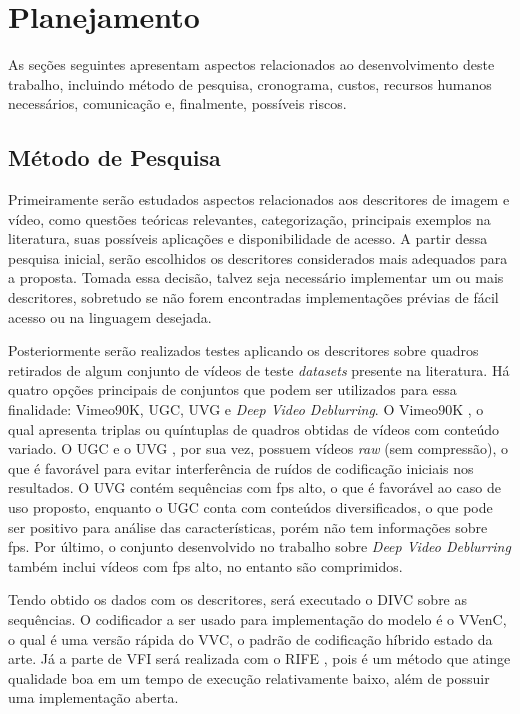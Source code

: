 \chapter{Planejamento}

As seções seguintes apresentam aspectos relacionados ao desenvolvimento deste trabalho, incluindo método de pesquisa, cronograma, custos, recursos humanos necessários, comunicação e, finalmente, possíveis riscos.

\section{Método de Pesquisa}

Primeiramente serão estudados aspectos relacionados aos descritores de imagem e vídeo, como questões teóricas relevantes, categorização, principais exemplos na literatura, suas possíveis aplicações e disponibilidade de acesso.
A partir dessa pesquisa inicial, serão escolhidos os descritores considerados mais adequados para a proposta.
Tomada essa decisão, talvez seja necessário implementar um ou mais descritores, sobretudo se não forem encontradas implementações prévias de fácil acesso ou na linguagem desejada.

Posteriormente serão realizados testes aplicando os descritores sobre quadros retirados de algum conjunto de vídeos de teste \textit{datasets} presente na literatura.
Há quatro opções principais de conjuntos que podem ser utilizados para essa finalidade: Vimeo90K, \ac{UGC}, \ac{UVG} e  \textit{Deep Video Deblurring}. O Vimeo90K \cite{vimeo90k}, o qual apresenta triplas ou quíntuplas de quadros obtidas de vídeos com conteúdo variado. O \ac{UGC} \cite{Wang2019YouTubeUGC} e o \ac{UVG} \cite{mercat2020uvg}, por sua vez, possuem vídeos \textit{raw} (sem compressão), o que é favorável para evitar interferência de ruídos de codificação iniciais nos resultados. O \ac{UVG} contém sequências com \ac{fps} alto, o que é favorável ao caso de uso proposto, enquanto o UGC conta com conteúdos diversificados, o que pode ser positivo para análise das características, porém não tem informações sobre \ac{fps}.
Por último, o conjunto desenvolvido no trabalho sobre \textit{Deep Video Deblurring} também inclui vídeos com \ac{fps} alto, no entanto são comprimidos.

Tendo obtido os dados com os descritores, será executado o \ac{DIVC} sobre as sequências.
O codificador a ser usado para implementação do modelo é o \ac{VVenC}, o qual é uma versão rápida do \ac{VVC}, o padrão de codificação híbrido estado da arte.
Já a parte de \ac{VFI} será realizada com o \ac{RIFE} \cite{rife}, pois é um método que atinge qualidade boa em um tempo de execução relativamente baixo, além de possuir uma implementação aberta.

